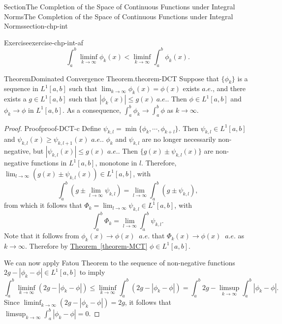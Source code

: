 \documentclass[oneside,10pt,]{article}
\newcommand{\xreffont}{\relax}
\numberwithin{equation}{section}
\begin{document}
\begin{sectionptx}{Section}{The Completion of the Space of Continuous Functions under Integral Norms}{}{The Completion of the Space of Continuous Functions under Integral Norms}{}{}{section-chp-int}
\begin{inlineexercise}{Exercise}{}{exercise-chp-int-af}
\begin{equation*}
\int_{a}^{b} \liminf_{k\to \infty} \phi_{k}(x) < \liminf_{k\to \infty} \int_{a}^{b} \phi_{k}(x)\text{.}
\end{equation*}
%
\end{inlineexercise}%
\begin{theorem}{Theorem}{Dominated Convergence Theorem.}{}{theorem-DCT}%
Suppose that \(\{\phi_{k}\}\) is a sequence in \(L^{1}[a, b]\) such that \(\lim_{k\to\infty} \phi_{k}(x) =\phi (x)\) exists \(a.e.\), and there exists a \(g\in L^{1}[a, b]\) such that \(|\phi_{k}(x)|\le g(x)\)\(\ a.e.\). Then \(\phi \in L^{1}[a, b]\) and \(\phi_{k}\to \phi\) in \(L^{1}[a, b]\). As a consequence, \(\int_{a}^{b} \phi_{k} \to \int_{a}^{b} \phi\) as \(k\to \infty\).\end{theorem}
\begin{proof}{Proof}{}{proof-DCT-c}
Define \(\psi_{k,l}=\min\{\phi_{k},\cdots, \phi_{k+l}\}\). Then \(\psi_{k,l}\in L^{1}[a, b]\) and \(\psi_{k,l}(x)\ge \psi_{k,l+1}(x)\) \(a.e.\). \(\phi_{k}\) and \(\psi_{k,l}\) are no longer necessarily non-negative, but \(|\psi_{k,l}(x)|\le g(x)\) \(a.e.\). Then \(\{ g(x)\pm \psi_{k,l}(x)\}\) are non-negative functions in \(L^{1}[a, b]\), monotone in \(l\). Therefore, \(\lim_{l\to\infty} (g(x)\pm \psi_{k,l}(x)) \in L^{1}[a, b]\), with%
\begin{equation*}
\int_{a}^{b}\left( g \pm \lim_{l\to\infty} \psi_{k,l}\right)
=\lim_{l\to\infty} \int_{a}^{b}\left( g\pm \psi_{k,l}\right),
\end{equation*}
from which it follows that \(\Phi_{k}= \lim_{l\to\infty} \psi_{k,l}\in L^{1}[a, b]\), with%
\begin{equation*}
\int_{a}^{b} \Phi_{k} = \lim_{l\to\infty} \int_{a}^{b} \psi_{k,l}.
\end{equation*}
Note that it follows from \(\phi_{k}(x)\to \phi(x)\) \(\ a.e.\) that  \(\Phi_{k}(x)\to \phi (x)\) \(\ a.e.\) as \(k\to \infty\). Therefore by \hyperref[theorem-MCT]{Theorem~{\xreffont\ref{theorem-MCT}}} \(\phi \in L^{1}[a, b]\).%
\par
We can now apply Fatou Theorem to the sequence of non-negative functions \(2 g - |\phi_{k}-\phi| \in L^{1}[a, b]\) to imply%
\begin{equation*}
\int_{a}^{b} \liminf_{k\to\infty}\left( 2 g - |\phi_{k}-\phi|\right)
\le \liminf_{k\to\infty} \int_{a}^{b} \left( 2 g - |\phi_{k}-\phi|\right)
= \int_{a}^{b} 2g - \limsup_{k\to\infty} \int_{a}^{b} |\phi_{k}-\phi|.
\end{equation*}
Since \(\liminf_{k\to\infty}\left( 2 g - |\phi_{k}-\phi|\right)=2g\), it follows that \(\limsup_{k\to\infty}  \int_{a}^{b }|\phi_{k}-\phi|=0\).%

\end{proof}
\end{sectionptx}
\end{document}
